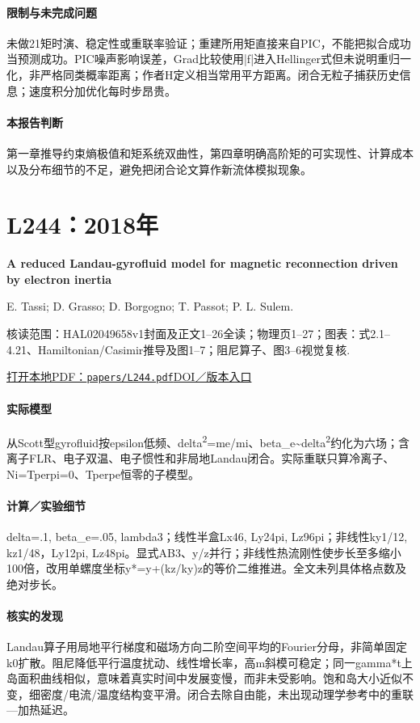 \paragraph{限制与未完成问题}未做21矩时演、稳定性或重联率验证；重建所用矩直接来自PIC，不能把拟合成功当预测成功。PIC噪声影响误差，Grad比较使用|f|进入Hellinger式但未说明重归一化，非严格同类概率距离；作者H定义相当常用平方距离。闭合无粒子捕获历史信息；速度积分加优化每时步昂贵。

\paragraph{本报告判断}第一章推导约束熵极值和矩系统双曲性，第四章明确高阶矩的可实现性、计算成本以及分布细节的不足，避免把闭合论文算作新流体模拟现象。

\section{L244：2018年}\label{paper:L244}

\textbf{A reduced Landau-gyrofluid model for magnetic reconnection driven by electron inertia}\citep{L244}\

E. Tassi;  D. Grasso;  D. Borgogno;  T. Passot;  P. L. Sulem.

\textsf{核读范围：}HAL02049658v1封面及正文1–26全读；物理页1–27；\textsf{图表：}式2.1–4.21、Hamiltonian/Casimir推导及图1–7；阻尼算子、图3–6视觉复核.

\href{run:papers/L244.pdf}{打开本地PDF：\texttt{papers/L244.pdf}}\quad\href{https://doi.org/10.1017/s002237781800051x}{DOI／版本入口}

\paragraph{实际模型}从Scott型gyrofluid按epsilon低频、delta\textsuperscript{2}=me/mi、beta\_e\textasciitilde{}delta\textsuperscript{2}约化为六场；含离子FLR、电子双温、电子惯性和非局地Landau闭合。实际重联只算冷离子、Ni=Tperpi=0、Tperpe恒零的子模型。

\paragraph{计算／实验细节}delta=.1, beta\_e=.05, lambda3；线性半盒Lx46, Ly24pi, Lz96pi；非线性ky1/12, kz1/48，Ly12pi, Lz48pi。显式AB3、y/z并行；非线性热流刚性使步长至多缩小100倍，改用单螺度坐标y*=y+(kz/ky)z的等价二维推进。全文未列具体格点数及绝对步长。

\paragraph{核实的发现}Landau算子用局地平行梯度和磁场方向二阶空间平均的Fourier分母，非简单固定k0扩散。阻尼降低平行温度扰动、线性增长率，高m斜模可稳定；同一gamma*t上岛面积曲线相似，意味着真实时间中发展变慢，而非未受影响。饱和岛大小近似不变，细密度/电流/温度结构变平滑。闭合去除自由能，未出现动理学参考中的重联—加热延迟。

